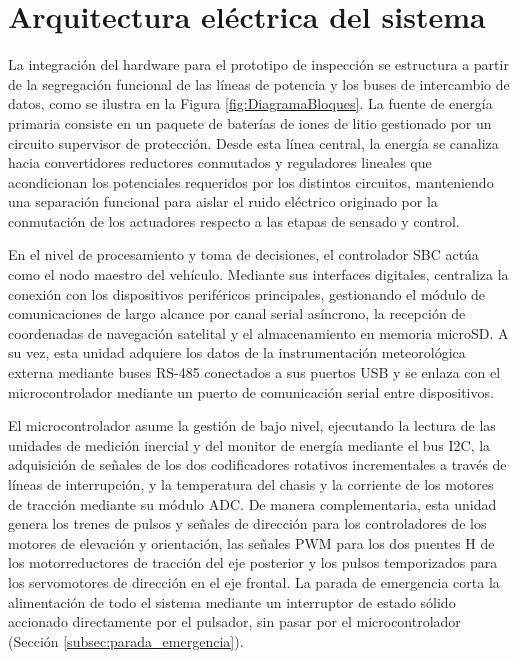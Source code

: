 \documentclass[../../General.tex]{subfiles}
\begin{document}
\section{Arquitectura eléctrica del sistema}

La integración del hardware para el prototipo de inspección se estructura a partir de la segregación funcional de las líneas de potencia y los buses de intercambio de datos, como se ilustra en la Figura \ref{fig:DiagramaBloques}. La fuente de energía primaria consiste en un paquete de baterías de iones de litio gestionado por un circuito supervisor de protección. Desde esta línea central, la energía se canaliza hacia convertidores reductores conmutados y reguladores lineales que acondicionan los potenciales requeridos por los distintos circuitos, manteniendo una separación funcional para aislar el ruido eléctrico originado por la conmutación de los actuadores respecto a las etapas de sensado y control.

En el nivel de procesamiento y toma de decisiones, el controlador SBC actúa como el nodo maestro del vehículo. Mediante sus interfaces digitales, centraliza la conexión con los dispositivos periféricos principales, gestionando el módulo de comunicaciones de largo alcance por canal serial asíncrono, la recepción de coordenadas de navegación satelital y el almacenamiento en memoria microSD. A su vez, esta unidad adquiere los datos de la instrumentación meteorológica externa mediante buses RS-485 conectados a sus puertos USB y se enlaza con el microcontrolador mediante un puerto de comunicación serial entre dispositivos.

El microcontrolador asume la gestión de bajo nivel, ejecutando la lectura de las unidades de medición inercial y del monitor de energía mediante el bus I2C, la adquisición de señales de los dos codificadores rotativos incrementales a través de líneas de interrupción, y la temperatura del chasis y la corriente de los motores de tracción mediante su módulo ADC. De manera complementaria, esta unidad genera los trenes de pulsos y señales de dirección para los controladores de los motores de elevación y orientación, las señales PWM para los dos puentes H de los motorreductores de tracción del eje posterior y los pulsos temporizados para los servomotores de dirección en el eje frontal. La parada de emergencia corta la alimentación de todo el sistema mediante un interruptor de estado sólido accionado directamente por el pulsador, sin pasar por el microcontrolador (Sección \ref{subsec:parada_emergencia}).
\end{document}
